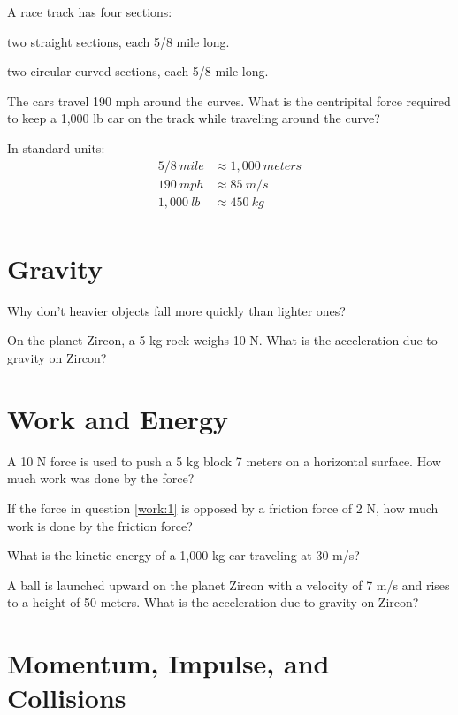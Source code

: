 \documentclass[fleqn,addpoints]{exam}
\begin{document}
\begin{questions}
\question
A race track has four sections:
\begin{itemize*}
\item two straight sections, each 5/8 mile long.
\item two circular curved sections, each 5/8 mile long.
\end{itemize*}

The cars travel 190 mph around the curves.  What is the centripital force
required to keep a 1,000 lb car on the track while traveling around the curve?

In standard units:
\begin{align*}
  5/8 \ mile &\approx 1,000 \ meters \\
  190 \ mph &\approx 85 \ m/s \\
  1,000 \ lb &\approx 450 \ kg \\
\end{align*}

\section{Gravity}

\question
Why don't heavier objects fall more quickly than lighter ones?

\question On the planet Zircon, a 5 kg rock weighs 10 N.  What is the
acceleration due to gravity on Zircon?

\section{Work and Energy}

\question
\label{work:1}
A 10 N force is used to push a 5 kg block 7 meters on a horizontal surface.
How much work was done by the force?

\question If the force in question \ref{work:1} is opposed by a friction force
of 2 N, how much work is done by the friction force?

\question
What is the kinetic energy of a 1,000 kg car traveling at 30 m/s?

\question
A ball is launched upward on the planet Zircon with a velocity of 7 m/s and rises to a height of 50 meters.  What is the acceleration due to gravity on Zircon?

\section{Momentum, Impulse, and Collisions}


\end{questions}
\end{document}
